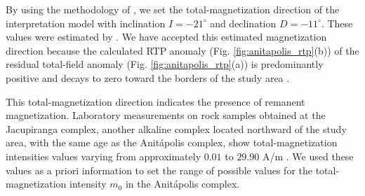 By using the methodology of \cite{reis-etal2020}, we set the total-magnetization direction of the interpretation model with inclination $ I=-21^\circ $ and declination $ D=-11^\circ $. These values were estimated by \cite{reis-seg-2019}. 
We have accepted this estimated magnetization direction because the calculated RTP anomaly 
(Fig. \ref{fig:anitapolis_rtp}(b)) of the residual total-field anomaly 
(Fig. \ref{fig:anitapolis_rtp}(a)) is predominantly positive and decays to zero toward
the borders of the study area \citep{reis-etal2020, reis-seg-2019}.

This total-magnetization direction indicates the presence of remanent magnetization.
Laboratory measurements on rock samples obtained at the Jacupiranga complex,
another alkaline complex located northward of the study area, 
with the same age as the Anit{\'a}polis complex, 
show total-magnetization intensities values varying from approximately 
$0.01$ to $29.90$ A/m \citep[][ tb. 1]{valdivia-2009}.
We used these values as a priori information to set the range of possible values 
for the total-magnetization intensity $m_{0}$ in the Anit{\'a}polis complex.

